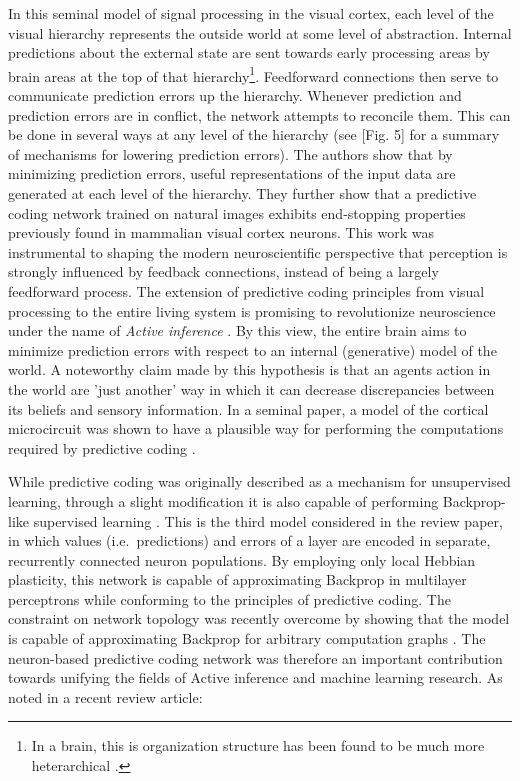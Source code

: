 In this seminal model of signal processing in the visual cortex, each level of the visual hierarchy represents the
outside world at some level of abstraction. Internal predictions about the external state are sent towards early
processing areas by brain areas at the top of that hierarchy\footnote{In a brain, this is organization structure has
  been found to be much more heterarchical \citep{felleman1991distributed}.}. Feedforward connections then serve to
communicate prediction errors up the hierarchy. Whenever prediction and prediction errors are in conflict, the network
attempts to reconcile them. This can be done in several ways at any level of the hierarchy (see
\citep{kwisthout2017precise}[Fig. 5] for a summary of mechanisms for lowering prediction errors). The authors show that
by minimizing prediction errors, useful representations of the input data are generated at each level of the hierarchy.
They further show that a predictive coding network trained on natural images exhibits end-stopping properties previously
found in mammalian visual cortex neurons. This work was instrumental to shaping the modern neuroscientific perspective
that perception is strongly influenced by feedback connections, instead of being a largely feedforward process. The
extension of predictive coding principles from visual processing to the entire living system is promising to
revolutionize neuroscience under the name of \textit{Active inference} \citep{Friston2008,Friston2009,Adams2015}. By
this view, the entire brain aims to minimize prediction errors with respect to an internal (generative) model of the
world. A noteworthy claim made by this hypothesis is that an agents action in the world are 'just another' way in which
it can decrease discrepancies between its beliefs and sensory information. In a seminal paper, a model of the cortical
microcircuit \citep{haeusler2007statistical} was shown to have a plausible way for performing the computations required
by predictive coding \citep{bastos2012canonical}.

While predictive coding was originally described as a mechanism for unsupervised learning, through a slight modification
it is also capable of performing Backprop-like supervised learning \citep{Whittington2017}. This is the third model
considered in the review paper, in which values (i.e.\ predictions) and errors of a layer are encoded in separate,
recurrently connected neuron populations. By employing only local Hebbian plasticity, this network is capable of
approximating Backprop in multilayer perceptrons while conforming to the principles of predictive coding. The constraint
on network topology was recently overcome by showing that the model is capable of approximating Backprop for arbitrary
computation graphs \citep{Millidge2022}. The neuron-based predictive coding network was therefore an important
contribution towards unifying the fields of Active inference and machine learning research. As noted in a recent review
article:

